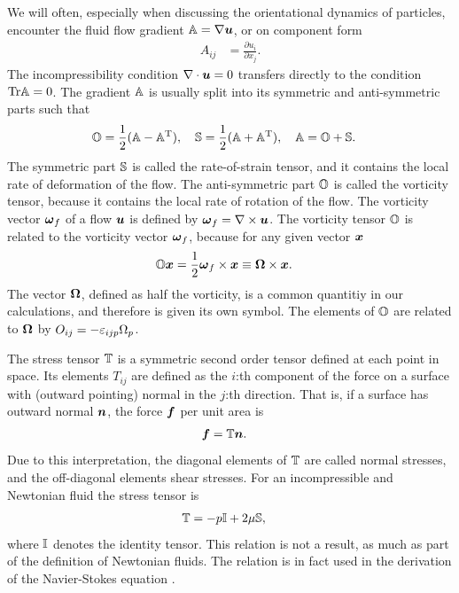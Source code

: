 \documentclass[thesis.tex]{subfiles}
\begin{document}
We will often, especially when discussing the orientational dynamics of particles, encounter the fluid flow gradient $\mathbb{A} = \nabla \mbox{\boldmath$u$}$, or on component form
\begin{align*}
	A_{ij} &= \frac{\partial u_i}{\partial x_j}.
\end{align*}
The incompressibility condition $\nabla\cdot\mbox{\boldmath$u$}=0$ transfers directly to the condition $\mbox{Tr} \mathbb{A}=0$. The gradient $\mathbb{A}$ is usually split into its symmetric and anti-symmetric parts such that
\begin{align*}
	&\mathbb{O} = \frac{1}{2}(\mathbb{A} - \mathbb{A}^{\mathrm T}),\quad
	\mathbb{S} = \frac{1}{2}(\mathbb{A} + \mathbb{A}^{\mathrm T}),\quad
	\mathbb{A} = \mathbb{O} + \mathbb{S}.
\end{align*}
The symmetric part $\mathbb{S}$ is called the rate-of-strain tensor, and it contains the local rate of deformation of the flow. The anti-symmetric part $\mathbb{O}$ is called the vorticity tensor, because it contains the local rate of rotation of the flow. The vorticity vector $\mbox{\boldmath$\omega$}_f$ of a flow $\mbox{\boldmath$u$}$ is defined by $\mbox{\boldmath$\omega$}_f = \nabla \times \mbox{\boldmath$u$}$. The vorticity tensor $\mathbb{O}$ is related to the vorticity vector $\mbox{\boldmath$\omega$}_f$, because for any given vector $\mbox{\boldmath$x$}$
\begin{align}
	\ma O \ve x &= \frac{1}{2}\ve \omega_f \cross \ve x \equiv \ve \Omega \cross \ve x.\eqnlab{vorticityOdef}
\end{align}
The vector $\mbox{\boldmath$\Omega$}$, defined as half the vorticity, is a common quantitiy in our calculations, and therefore is given its own symbol. The elements of $\mathbb{O}$ are related to $\mbox{\boldmath$\Omega$}$ by $O_{ij} = -\varepsilon_{ijp}\Omega_p$.

The stress tensor $\mathbb{T}$ is a symmetric second order tensor defined at each point in space. Its elements $T_{ij}$ are defined as the $i$:th component of the force on a surface with (outward pointing) normal in the $j$:th direction. That is, if a surface has outward normal $\mbox{\boldmath$n$}$, the force $\mbox{\boldmath$f$}$ per unit area is
\begin{align*}
	\mbox{\boldmath$f$} &= \mathbb{T} \mbox{\boldmath$n$}.
\end{align*}
Due to this interpretation, the diagonal elements of $\mathbb{T}$ are called normal stresses, and the off-diagonal elements shear stresses. For an incompressible and Newtonian fluid the stress tensor is
\begin{align*}
	\mathbb{T} &= -p \mathbb{I} + 2\mu \mathbb{S},
\end{align*}
where $\mathbb{I}$ denotes the identity tensor. This relation is not a result, as much as part of the definition of Newtonian fluids. The relation is in fact used in the derivation of the Navier-Stokes equation  \cite{kundu2004}. 
\end{document}
